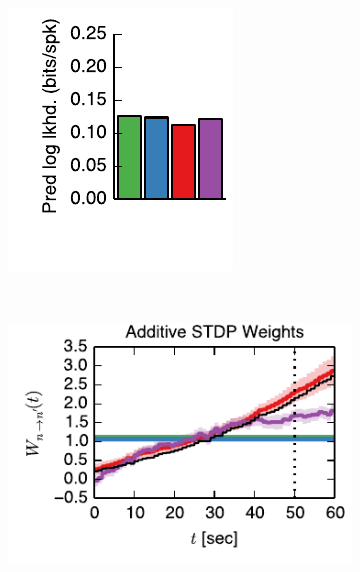 \begin{figure}[t!]
\begin{subfigure}[T]{1.45in}
    \label{fig:fig3_static_stdp_rule}
  \end{subfigure}
  \begin{subfigure}[T]{1.45in}
    \includegraphics[width=\textwidth]{figures/ch6/fig3_static_pred_ll}    
    \label{fig:fig3_static_pred_ll}
  \end{subfigure} \\
  \vspace{-1.5em}
  \begin{subfigure}[T]{2.4in}
    \flushleft
    \includegraphics[width=\textwidth]{figures/ch6/fig3_add_nothr_trajectory}    

\end{subfigure}
\end{figure}
